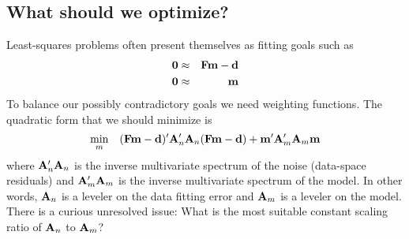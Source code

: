 \subsection{What should we optimize?}
Least-squares problems often present themselves as fitting goals such as
\begin{eqnarray}
\bold 0 &\approx&  \bold F \bold m - \bold d\\
\bold 0 &\approx&          \bold m
\end{eqnarray}
To balance our possibly contradictory goals we need weighting functions.
The quadratic form that we should minimize is
\begin{equation}
\min_m \quad
(\bold F \bold m - \bold d)'
\bold A'_n \bold A_n
(\bold F \bold m - \bold d)
         +
         \bold m' \bold A'_m \bold A_m \bold m
\end{equation}
where $\bold A'_n \bold A_n$ is the inverse multivariate spectrum of the noise
(data-space residuals) and
$\bold A'_m \bold A_m$ is the inverse multivariate spectrum of the model.
In other words,
$\bold A_n$ is a leveler on the data fitting error and
$\bold A_m$ is a leveler on the model.
There is a curious unresolved issue:
What is the most suitable constant scaling ratio
of $\bold A_n$ to $\bold A_m$?
%
